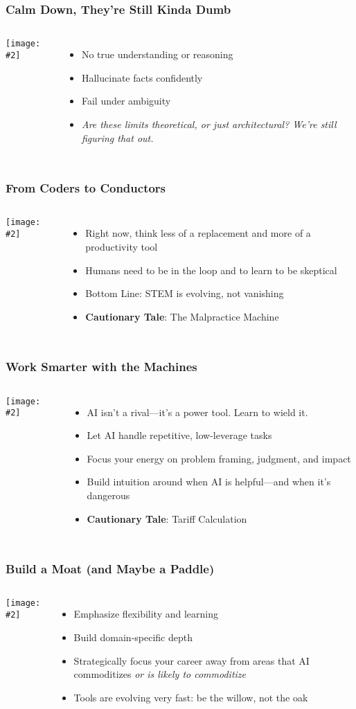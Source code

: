 \documentclass{beamer}
\newcommand{\slidewithimage}[3]{%
  \begin{frame}
    \frametitle{#1}
    \begin{columns}
      \column{0.5\textwidth}
        \texttt{[image: \#2]}\\[1em]
      \column{0.5\textwidth}
        #3
    \end{columns}
  \end{frame}
}
\begin{document}
\slidewithimage{Calm Down, They’re Still Kinda Dumb}{limitations-image.png}{
  \begin{itemize}
    \item No true understanding or reasoning
    \item Hallucinate facts confidently
    \item Fail under ambiguity
    \item \textit{Are these limits theoretical, or just architectural? We're still figuring that out.}
  \end{itemize}
}

\slidewithimage{From Coders to Conductors}{roles-image.png}{
  \begin{itemize}
    \item Right now, think less of a replacement and more of a productivity tool
    \item Humans need to be in the loop and to learn to be skeptical
    \item Bottom Line: STEM is evolving, not vanishing
    \item \textbf{Cautionary Tale}: The Malpractice Machine
  \end{itemize}
}

\slidewithimage{Work Smarter with the Machines}{coexist-image.png}{
  \begin{itemize}
    \item AI isn't a rival—it's a power tool. Learn to wield it.
    \item Let AI handle repetitive, low-leverage tasks
    \item Focus your energy on problem framing, judgment, and impact
    \item Build intuition around when AI is helpful—and when it’s dangerous
    \item \textbf{Cautionary Tale}: Tariff Calculation
  \end{itemize}
}

\slidewithimage{Build a Moat (and Maybe a Paddle)}{career-image.png}{
  \begin{itemize}
    \item Emphasize flexibility and learning
    \item Build domain-specific depth
    \item Strategically focus your career away from areas that AI commoditizes \textit{or is likely to commoditize}
    \item Tools are evolving very fast: be the willow, not the oak
  \end{itemize}
}
\end{document}
